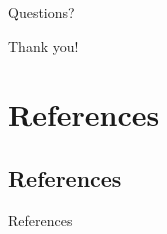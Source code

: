 \documentclass[onlymath,xcolor=pdftex,dvipsnames,table]{beamer}
\begin{document}
\begin{frame}{Questions?}
\begin{center}
  \LARGE Thank you!
\end{center}
\end{frame}


\section{References}
\subsection{References}
\begin{frame}[allowframebreaks]{References}
  
  
\end{frame}
\end{document}
